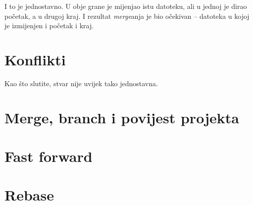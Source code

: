 I to je jednostavno.
U obje grane je mijenjao istu datoteku, ali u jednoj je dirao početak, a u drugoj kraj.
I rezultat \emph{merge}anja je bio očekivan -- datoteka u kojoj je izmijenjen i početak i kraj.

\section*{Konflikti}

Kao što slutite, stvar nije uvijek tako jednostavna.

\section*{Merge, branch i povijest projekta}

\section*{Fast forward}

\section*{Rebase}



